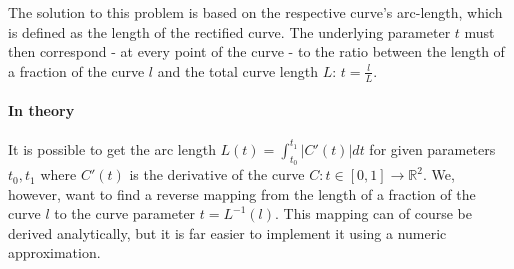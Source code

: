 The solution to this problem is based on the respective curve's arc-length, which is defined as the length of the rectified curve. The underlying parameter $t$ must then correspond - at every point of the curve - to the ratio between the length of a fraction of the curve $l$ and the total curve length $L$: $t = \frac{l}{L}$.

\paragraph{In theory}
It is possible to get the arc length $L(t)=\int_{t_{0}}^{t_{1}} \left|C'(t)\right| dt$ for given parameters $t_{0}, t_{1}$ where $C'(t)$ is the derivative of the curve $C:t \in [0,1] \rightarrow \mathbb{R}^2$. We, however, want to find a reverse mapping from the length of a fraction of the curve $l$ to the curve parameter $t = L^{-1}(l)$. 
This mapping can of course be derived analytically, but it is far easier to implement it using a numeric approximation. 

